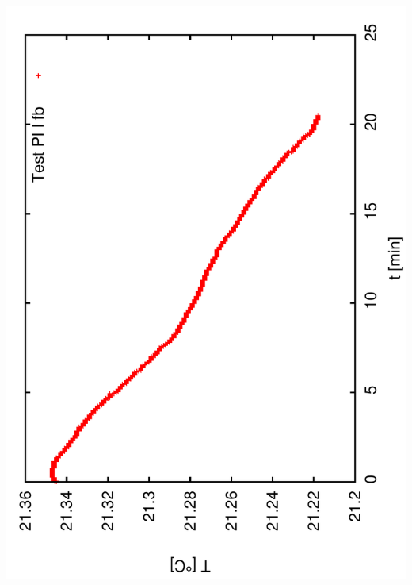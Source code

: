 \documentclass[a4paper,11pt]{book}
\begin{document}
\includegraphics[angle=-90,scale=0.15]{image41a.pdf}\\
\end{document}
